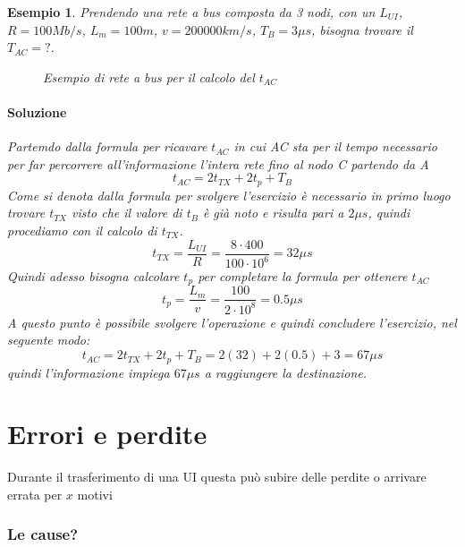 \documentclass{book}
\newtheorem{esempio}{Esempio}[section]
\begin{document}
\begin{esempio}
  Prendendo una rete a bus composta da 3 nodi, con un $L_{UI}$, $R=100Mb/s$, $L_m=100m$, $v=200000km/s$, $T_B=3\mu s$, bisogna trovare il $T_{AC}=?$.
  \begin{figure}[!ht]
    \centering
    
    \caption{Esempio di rete a bus per il calcolo del $t_{AC}$}
    \label{fig:tac}
  \end{figure}
  \paragraph{Soluzione}
  Partemdo dalla formula per ricavare $t_{AC}$ in cui AC sta per il tempo necessario per far percorrere
  all'informazione l'intera rete fino al nodo C partendo da A
  \begin{equation*}
    t_{AC}=2t_{TX}+2t_p+T_B
  \end{equation*}
  Come si denota dalla formula per svolgere l'esercizio è necessario in primo luogo trovare $t_{TX}$ visto che
  il valore di $t_B$ è già noto e risulta pari a $2\mu s$, quindi procediamo con il calcolo di $t_{TX}$.
  \begin{equation*}
    t_{TX}=\frac{L_{UI}}{R}=\frac{8\cdot 400}{100\cdot 10^6} = 32\mu s
  \end{equation*}
  Quindi adesso bisogna calcolare $t_p$ per completare la formula per ottenere $t_{AC}$
  \begin{equation*}
    t_p=\frac{L_m}{v} = \frac{100}{2\cdot 10^8}=0.5 \mu s
  \end{equation*}
  \clearpage
  A questo punto è possibile svolgere l'operazione e quindi concludere l'esercizio, nel seguente modo:
  \begin{equation*}
    t_{AC}=2t_{TX}+2t_p+T_B= 2\left(32\right) + 2\left(0.5\right)+3= 67\mu s
  \end{equation*}
  quindi l'informazione impiega $67\mu s$ a raggiungere la destinazione.
\end{esempio}

\section{Errori e perdite}
\label{sec:erreper}
Durante il trasferimento di una UI questa può subire delle perdite o arrivare errata per $x$ motivi

\subsubsection{Le cause?}
\end{document}
